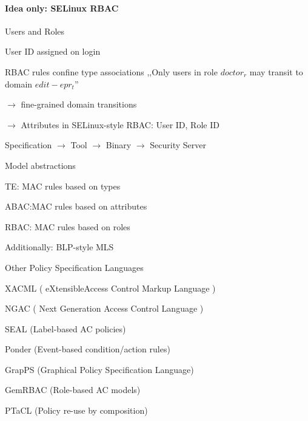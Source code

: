 \documentclass[a4paper]{article}
\begin{document}
\begin{multicols}{3}
    \paragraph{Idea only: SELinux RBAC}
    Users and Roles
    \begin{itemize*}
        \item User ID assigned on login
        \item RBAC rules confine type associations ,,Only users in role $doctor_r$ may transit to domain $edit-epr_t$''
        \item[$\rightarrow$] fine-grained domain transitions
        \item[$\rightarrow$] Attributes in SELinux-style RBAC: User ID, Role ID
        \item Specification $\rightarrow$ Tool $\rightarrow$ Binary $\rightarrow$ Security Server
    \end{itemize*}

    Model abstractions
    \begin{itemize*}
        \item TE: MAC rules based on types
        \item ABAC:MAC rules based on attributes
        \item RBAC: MAC rules based on roles
        \item Additionally: BLP-style MLS
    \end{itemize*}

    Other Policy Specification Languages
    \begin{itemize*}
        \item XACML ( eXtensibleAccess Control Markup Language )
        \item NGAC ( Next Generation Access Control Language )
        \item SEAL (Label-based AC policies)
        \item Ponder (Event-based condition/action rules)
        \item GrapPS (Graphical Policy Specification Language)
        \item GemRBAC (Role-based AC models)
        \item PTaCL (Policy re-use by composition)
    \end{itemize*}


\end{multicols}
\end{document}

